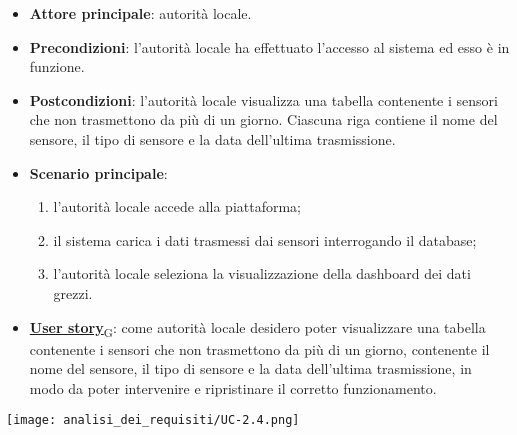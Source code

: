 \begin{itemize}
	\item \textbf{Attore principale}: autorità locale.
	\item \textbf{Precondizioni}: l'autorità locale ha effettuato l'accesso al sistema ed esso è in funzione.
	\item \textbf{Postcondizioni}: l'autorità locale visualizza una tabella contenente i sensori che non trasmettono da più di un giorno. Ciascuna riga
	      contiene il nome del sensore, il tipo di sensore e la data dell'ultima trasmissione.
	\item \textbf{Scenario principale}:
	      \begin{enumerate}
		      \item l'autorità locale accede alla piattaforma;
		      \item il sistema carica i dati trasmessi dai sensori interrogando il database;
		      \item l'autorità locale seleziona la visualizzazione della dashboard dei dati grezzi.
	      \end{enumerate}
	\item \href{https://7last.github.io/docs/pb/documentazione-interna/glossario\#user-story}{\textbf{User story}\textsubscript{G}}:
	      come autorità locale desidero poter visualizzare una tabella contenente i sensori che non trasmettono da più di un giorno, contenente
	      il nome del sensore, il tipo di sensore e la data dell'ultima trasmissione, in modo da poter intervenire e ripristinare il corretto funzionamento.
\end{itemize}
\begin{center}
	\texttt{[image: analisi\_dei\_requisiti/UC-2.4.png]}
\end{center}

